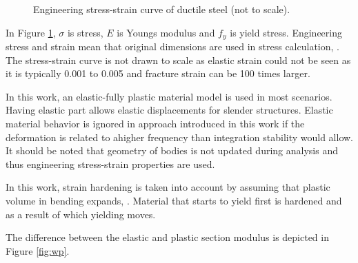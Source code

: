 \begin{figure}[htb!]
\centering
{}
\caption{Engineering stress-strain curve of ductile steel (not to scale).}
\label{fig:sscurve}
\end{figure}

In Figure \ref{fig:sscurve}, $\sigma$ is stress, $E$ is Youngs modulus and $f_y$ is yield stress.
Engineering stress and strain mean that original dimensions are used in stress calculation,
\citet{dowling}.
The stress-strain curve is not drawn to scale as elastic strain could not be seen as it is typically 
0.001 to 0.005 and fracture strain can be 100 times larger.

In this work, an elastic-fully plastic material model is used in most scenarios.
Having elastic part allows elastic displacements for slender structures. 
Elastic material behavior is ignored in approach introduced in this work if
the deformation is related to ahigher frequency
than integration stability would allow.
It should be noted that geometry
of bodies is not updated during analysis and thus engineering stress-strain properties are used.

In this work, strain hardening is taken into account by assuming that plastic volume in bending
expands, 
\citet{dowling}.
Material that starts to yield first is hardened and as a result of which yielding moves.

The difference between the elastic and plastic section modulus is depicted in Figure \ref{fig:wp}.

